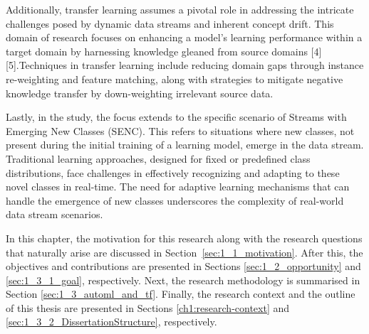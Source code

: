 Additionally, transfer learning assumes a pivotal role in addressing the intricate challenges posed by dynamic data streams and inherent concept drift. This domain of research focuses on enhancing a model's learning performance within a target domain by harnessing knowledge gleaned from source domains [4] [5].Techniques in transfer learning include reducing domain gaps through instance re-weighting and feature matching, along with strategies to mitigate negative knowledge transfer by down-weighting irrelevant source data.

Lastly, in the study, the focus extends to the specific scenario of Streams with Emerging New Classes (SENC). This refers to situations where new classes, not present during the initial training of a learning model, emerge in the data stream. Traditional learning approaches, designed for fixed or predefined class distributions, face challenges in effectively recognizing and adapting to these novel classes in real-time. The need for adaptive learning mechanisms that can handle the emergence of new classes underscores the complexity of real-world data stream scenarios.
     

In this chapter, the motivation for this research along with the research questions
that naturally arise are discussed in  Section~\ref{sec:1_1_motivation}. After this, the objectives and contributions are presented in Sections \ref{sec:1_2_opportunity} and \ref{sec:1_3_1_goal}, respectively. Next, the
research methodology is summarised in Section \ref{sec:1_3_automl_and_tf}. Finally,
the research context and the outline of this thesis are presented in Sections \ref{ch1:research-context} and
\ref{sec:1_3_2_DissertationStructure}, respectively.